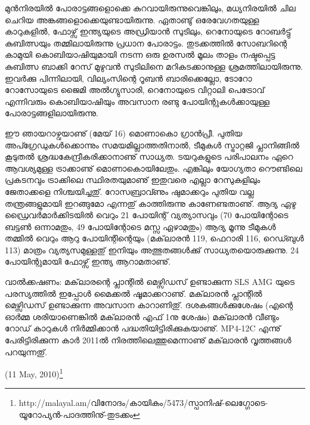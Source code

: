 മുന്‍നിരയില്‍ പോരാട്ടങ്ങളൊക്കെ കുറവായിരുന്നുവെങ്കിലും, മധ്യനിരയില്‍ ചില ചെറിയ അങ്കങ്ങളൊക്കെയുണ്ടായിരുന്നു.
ഏതാണ്ടു് ഒരേവേഗതയുള്ള കാറുകളില്‍, ഫോഴ്സ് ഇന്ത്യയുടെ അഡ്രിയാന്‍ സുടിലും, റെനോയുടെ റോബര്‍ട്ടു് കുബിത്സയും 
തമ്മിലായിരുന്നു പ്രധാന പോരാട്ടം. തുടക്കത്തില്‍ സോബറിന്റെ കാമുയി കൊബിയാഷിയുമായി നടന്ന ഒരു ഉരസല്‍ മൂലം 
താളം നഷ്ടപ്പെട്ട കുബിത്സ ബാക്കി റേസ് മുഴുവന്‍ സുടിലിനെ മറികടക്കാനുള്ള ശ്രമത്തിലായിരുന്നു. ഇവര്‍ക്കു പിന്നിലായി, 
വില്യംസിന്റെ റൂബന്‍ ബാരിക്കെല്ലോ, ടോറോ റോസോയുടെ ജൈമി അല്‍ഗ്യുസാരി, റെനോയുടെ വിറ്റാലി പെട്രോവ് 
എന്നിവരും കൊബിയാഷിയും അവസാന രണ്ടു പോയിന്റുകള്‍ക്കായുള്ള പോരാട്ടങ്ങളിലായിരുന്നു.

ഈ ഞായറാഴ്വയാണു് (മേയ് 16) മൊണാകൊ ഗ്രാന്‍പ്രീ. പുതിയ അപ്ഗ്രേഡുകള്‍ക്കൊന്നും സമയമില്ലാത്തതിനാല്‍, 
ടീമുകള്‍ സ്ട്രാറ്റജി പ്ലാനിങ്ങില്‍ കൂടുതല്‍ ശ്രദ്ധകേന്ദ്രീകരിക്കാനാണു് സാധ്യത. ടയറുകളുടെ പരിപാലനം ഏറെ ആവശ്യമുള്ള 
ട്രാക്കാണു് മൊണാകൊയിലേതും. എങ്കിലും യോഗ്യതാ റൌണ്ടിലെ പ്രകടനവും ട്രാക്കിലെ സ്ഥിരതയുമാണു് ഇതുവരെ 
എല്ലാ റേസുകളിലും ജേതാക്കളെ നിശ്ചയിച്ചതു്. റോസബ്രാവ്ണും ഷുമാക്കറും പുതിയ വല്ല തന്ത്രങ്ങളുമായി ഇറങ്ങുമോ
എന്നതു് കാത്തിരുന്നു കാണേണ്ടതാണു്. ആദ്യ ഏഴു ഡ്രൈവര്‍മാര്‍ക്കിടയില്‍ വെറും 21 പോയിന്റ് വ്യത്യാസവും 
(70 പോയിന്റോടെ ബട്ടണ്‍ ഒന്നാമതും, 49 പോയിന്റോടെ മസ്സ ഏഴാമതും) ആദ്യ മൂന്നു ടീമുകള്‍ തമ്മില്‍ വെറും ആറു 
പോയിന്റിന്റെയും (മക്‌ലാരന്‍ 119, ഫെറാരി 116, റെഡ്ബുള്‍ 113) മാത്രം വ്യത്യസമുള്ളതു് ഇനിയും അത്ഭുതങ്ങള്‍ക്കു് 
സാധ്യതയൊരുക്കുന്നു. 24 പോയിന്റുമായി ഫോഴ്സ് ഇന്ത്യ ആറാമതാണു്.

വാല്‍ക്കഷണം: മക്‌ലാരന്റെ പ്ലാന്റില്‍ മെഴ്സിഡസ് ഉണ്ടാക്കുന്ന SLS AMG യുടെ പരസ്യത്തില്‍ ഇപ്പോള്‍ മൈക്കല്‍ 
ഷൂമാക്കറാണു്. മക്‌ലാരന്‍ പ്ലാന്റില്‍ മെഴ്സിഡസ് ഉണ്ടാക്കുന്ന അവസാന കാറാണിതു്. ദശകങ്ങള്‍ക്കുശേഷം (എന്റെ 
ഓര്‍മ്മ ശരിയാണെങ്കില്‍ മക്‌ലാരന്‍ എഫ് 1നു ശേഷം) മക്‌ലാരന്‍ വീണ്ടും റോഡ് കാറുകള്‍ നിര്‍മ്മിക്കാന്‍ 
പദ്ധതിയിട്ടിരിക്കുകയാണു്. MP4-12C എന്നു് പേരിട്ടിരിക്കുന്ന കാര്‍ 2011ല്‍ നിരത്തിലെത്തുമെന്നാണു് മക്‌ലാരന്‍ 
വൃത്തങ്ങള്‍ പറയുന്നതു്.

\hspace*{2em}(11 May, 2010)\footnote{http://malayal.am/വിനോദം/കായികം/5473/സ്പാനിഷ്-ലെഗ്ഗോടെ-യൂറോപ്യന്‍-പാദത്തിനു്-തുടക്കം}

\newpage
